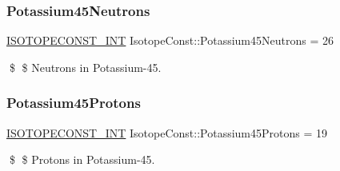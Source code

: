 \subsubsection{\texorpdfstring{Potassium45\+Neutrons}{Potassium45Neutrons}}
{\footnotesize\ttfamily \mbox{\hyperlink{group___isotope_const-_macros_ga5f18360b3e99483a35c32d789e62621c}{I\+S\+O\+T\+O\+P\+E\+C\+O\+N\+S\+T\+\_\+\+I\+NT}} Isotope\+Const\+::\+Potassium45\+Neutrons = 26}

\$ \$ Neutrons in Potassium-\/45. \mbox{\label{group___isotope_const-_potassium-_k45_gabbced0f14fd86cad848763cadf9f3087}} 
\subsubsection{\texorpdfstring{Potassium45\+Protons}{Potassium45Protons}}
{\footnotesize\ttfamily \mbox{\hyperlink{group___isotope_const-_macros_ga5f18360b3e99483a35c32d789e62621c}{I\+S\+O\+T\+O\+P\+E\+C\+O\+N\+S\+T\+\_\+\+I\+NT}} Isotope\+Const\+::\+Potassium45\+Protons = 19}

\$ \$ Protons in Potassium-\/45. 